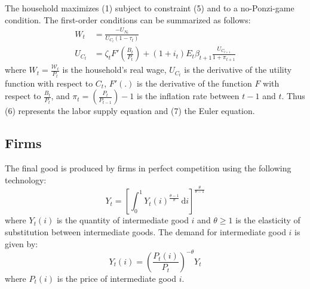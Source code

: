 \documentclass[12pt,letterpaper]{article}
\newcommand{\Et}{E_t}
\newcommand{\WW}{\mathcal{W}}
\begin{document}
The household maximizes (1) subject to constraint (5) and to a no-Ponzi-game condition. The first-order conditions can be summarized as follows:
\begin{align}
W_t &= \frac{-U_{N_t}}{U_{C_t}(1-\tau_t)} \tag{6}\\
U_{C_t} &= \zeta_t F'\!\left(\frac{B_t}{P_t}\right) + (1+i_t)\Et \beta_{t+1} \frac{U_{C_{t+1}}}{1+\pi_{t+1}} \tag{7}
\end{align}
where $W_t = \frac{\WW_t}{P_t}$ is the household's real wage, $U_{C_t}$ is the derivative of the utility function with respect to $C_t$, $F'(.)$ is the derivative of the function $F$ with respect to $\frac{B_t}{P_t}$, and $\pi_t = \left(\frac{P_t}{P_{t-1}}\right) - 1$ is the inflation rate between $t-1$ and $t$. Thus (6) represents the labor supply equation and (7) the Euler equation.

\subsection{Firms}

The final good is produced by firms in perfect competition using the following technology:
\begin{equation}
Y_t = \left[\int_0^1 Y_t(i)^{\frac{\theta-1}{\theta}}\, \mathrm{d}i\right]^{\frac{\theta}{\theta-1}} \tag{8}
\end{equation}
where $Y_t(i)$ is the quantity of intermediate good $i$ and $\theta \geq 1$ is the elasticity of substitution between intermediate goods. The demand for intermediate good $i$ is given by:
\begin{equation}
Y_t(i) = \left(\frac{P_t(i)}{P_t}\right)^{-\theta} Y_t \tag{9}
\end{equation}
where $P_t(i)$ is the price of intermediate good $i$.
\end{document}
